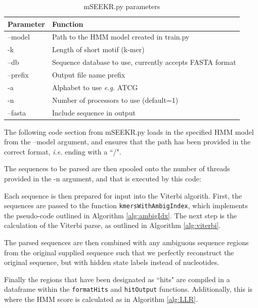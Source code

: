 \begin{table}[h]
\centering
 \begin{tabular}{|l l|}
 \hline
 Parameter & Function\\
 \hline
 --model & Path to the HMM model created in train.py \\
 -k & Length of short motif (k-mer) \\
 --db & Sequence database to use, currently accepts FASTA format\\
 --prefix & Output file name prefix \\
 -a & Alphabet to use \emph{e.g.} ATCG \\
 -n & Number of processors to use (default=1)\\
 --fasta & Include sequence in output \\
 \hline
 
\end{tabular}
\caption{mSEEKR.py parameters}
\label{tab:viterbiparams}
\end{table}

The following code section from mSEEKR.py loads in the specified HMM model from the --model argument, and ensures that the path has been provided in the correct format, \emph{i.e.} ending with a ``/". 


The sequences to be parsed are then spooled onto the number of threads provided in the -n argument, and that is executed by this code:



Each sequence is then prepared for input into the Viterbi algorith. First, the sequences are passed to the function \texttt{kmersWithAmbigIndex}, which implements the pseudo-code outlined in Algorithm \ref{alg:ambigIdx}. The next step is the calculation of the Viterbi parse, as outlined in Algorithm \ref{alg:viterbi}. 



The parsed sequences are then combined with any ambiguous sequence regions from the original supplied sequence such that we perfectly reconstruct the original sequence, but with hidden state labels instead of nucleotides. 

Finally the regions that have been designated as ``hits" are compiled in a dataframe within the \texttt{formatHits} and \texttt{hitOutput} functions. Additionally, this is where the HMM score is calculated as in Algorithm \ref{alg:LLR}. 

